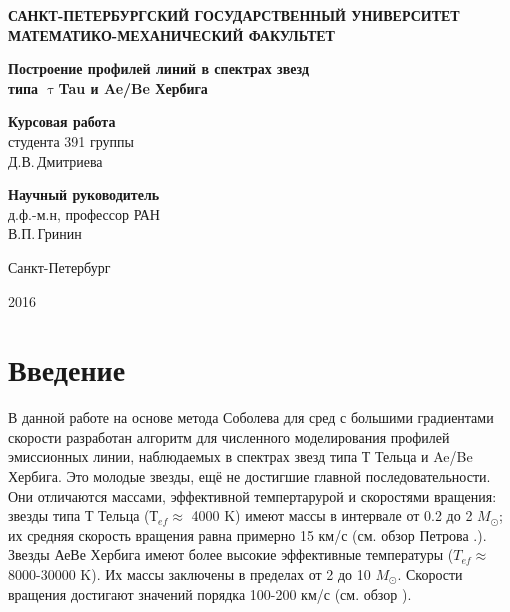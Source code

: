 \documentclass{article}
\begin{document}
\begin{titlepage}
\begin{center}
{\bf САНКТ-ПЕТЕРБУРГСКИЙ ГОСУДАРСТВЕННЫЙ УНИВЕРСИТЕТ\\
МАТЕМАТИКО-МЕХАНИЧЕСКИЙ ФАКУЛЬТЕТ\\}
\end{center}

\vspace{2cm}
 \begin{center}
  \Huge{\bf{Построение профилей линий в спектрах
   звезд\\ типа 
   $\uptau$Tau и Ae/Be Хербига }}
 \end{center}

\vspace{2cm}

\large
 \hspace{8cm}\parbox{8cm}{	

{\bf Курсовая работа}\\
студента 391 группы\\
Д.В.\,Дмитриева  
\vspace{1cm}

{\bf Научный руководитель}\\
 д.ф.-м.н, профессор РАН\\ В.П.\,Гринин \\ 
}

\vfill 
\begin{center}
Санкт-Петербург

2016
\end{center}

\end{titlepage}
\newpage
\tableofcontents
\newpage



\section{Введение}



В данной работе на основе метода Соболева \cite{sobolev47} для сред с большими градиентами скорости разработан алгоритм для численного моделирования 
профилей эмиссионных линии, наблюдаемых в спектрах звезд типа Т Тельца и Ae/Be Хербига. 
Это молодые звезды, ещё не достигшие главной последовательности. Они отличаются массами, эффективной темпертарурой и скоростями вращения: 
звезды типа Т Тельца ($Т_{ef} \approx$ 4000 K) имеют массы в интервале от 0.2 до 2 $M_\odot$; их средняя скорость вращения равна примерно 15 км/с 
(см. обзор Петрова \cite{petrov}.). Звезды АеВе Хербига имеют более высокие эффективные температуры ($T_{ef} \approx$ 8000-30000 K). 
Их массы заключены в пределах от 2 до 10 $M_\odot$. Скорости вращения достигают значений порядка 100-200 км/с (см. обзор \cite{waters98}).
     
\end{document}
